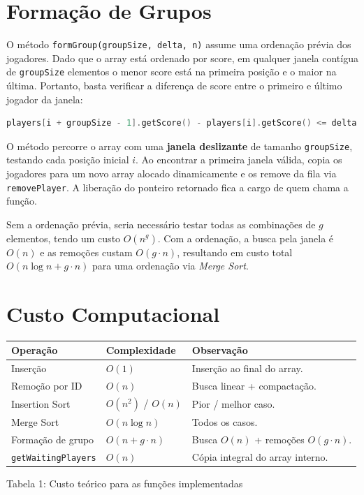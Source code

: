 \documentclass[11pt,a4paper]{article}
\begin{document}
\section{Formação de Grupos}
 
O método \texttt{formGroup(groupSize, delta, n)} assume uma ordenação prévia dos jogadores. Dado que o array está ordenado por score, em qualquer janela contígua de \texttt{groupSize} elementos o menor score está na primeira posição e o maior na última. Portanto, basta verificar a diferença de score entre o primeiro e último jogador da janela:
 
\begin{lstlisting}[language=C++]
players[i + groupSize - 1].getScore() - players[i].getScore() <= delta
\end{lstlisting}
 
O método percorre o array com uma \textbf{janela deslizante} de tamanho \texttt{groupSize}, testando cada posição inicial $i$. Ao encontrar a primeira janela válida, copia os jogadores para um novo array alocado dinamicamente e os remove da fila via \texttt{removePlayer}. A liberação do ponteiro retornado fica a cargo de quem chama a função.
 
Sem a ordenação prévia, seria necessário testar todas as combinações de $g$ elementos, tendo um custo $O(n^g)$. Com a ordenação, a busca pela janela é $O(n)$ e as remoções custam $O(g \cdot n)$, resultando em custo total $O(n \log n + g \cdot n)$ para uma ordenação via \textit{Merge Sort}.

\section{Custo Computacional}
 
\begin{center}
\begin{tabular}{L{4.2cm} C{2.8cm} L{6.5cm}}
  \toprule
  \textbf{Operação} & \textbf{Complexidade} & \textbf{Observação} \\
  \midrule
  Inserção               & $O(1)$              & Inserção ao final do array. \\
  Remoção por ID         & $O(n)$              & Busca linear + compactação. \\
  Insertion Sort         & $O(n^2)$ / $O(n)$   & Pior / melhor caso. \\
  Merge Sort             & $O(n \log n)$       & Todos os casos. \\
  Formação de grupo      & $O(n + g \cdot n)$  & Busca $O(n)$ + remoções $O(g \cdot n)$. \\
  \texttt{getWaitingPlayers} & $O(n)$          & Cópia integral do array interno. \\
  \bottomrule
\end{tabular}

\small Tabela 1: Custo teórico para as funções implementadas
\end{center}
\end{document}
